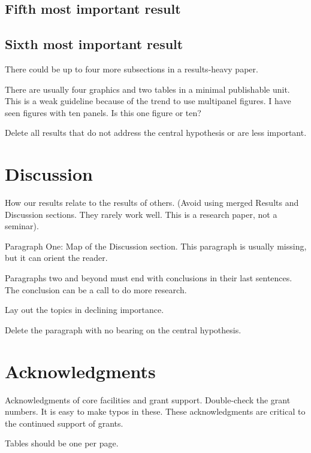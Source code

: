\documentclass[11pt,letterpaper]{article}
\begin{document}
\subsection*{Fifth most important result}
\label{sec:org41b4c68}

\subsection*{Sixth most important result}
\label{sec:org48ab16c}

There could be up to four more subsections in a results-heavy paper.

There are usually four graphics and two tables in a minimal publishable unit.
This is a weak guideline because of the trend to use multipanel figures.
I have seen figures with ten panels.
Is this one figure or ten?

Delete all results that do not address the central hypothesis or are less important.

\section*{Discussion}
\label{sec:org936b4a3}

How our results relate to the results of others.
(Avoid using merged Results and Discussion sections.
They rarely work well.
This is a research paper, not a seminar).

Paragraph One: Map of the Discussion section.
This paragraph is usually missing, but it can orient the reader.

Paragraphs two and beyond must end with conclusions in their last sentences.
The conclusion can be a call to do more research.

Lay out the topics in declining importance.

Delete the paragraph with no bearing on the central hypothesis.


\section*{Acknowledgments}
\label{sec:org2744cc4}

Acknowledgments of core facilities and grant support.
Double-check the grant numbers.
It is easy to make typos in these.
These acknowledgments are critical to the continued support of grants.

\newpage



\newpage
\listoftables
Tables should be one per page.
\end{document}
